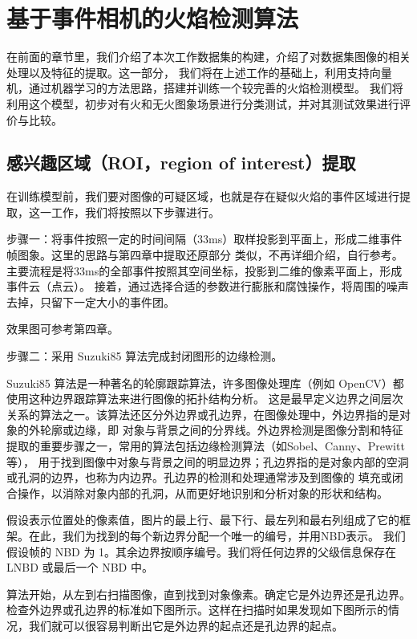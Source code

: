 
\chapter{基于事件相机的火焰检测算法}
在前面的章节里，我们介绍了本次工作数据集的构建，介绍了对数据集图像的相关处理以及特征的提取。这一部分，
我们将在上述工作的基础上，利用支持向量机，通过机器学习的方法思路，搭建并训练一个较完善的火焰检测模型。
我们将利用这个模型，初步对有火和无火图象场景进行分类测试，并对其测试效果进行评价与比较。

\section{感兴趣区域（ROI，region of interest）提取}
在训练模型前，我们要对图像的可疑区域，也就是存在疑似火焰的事件区域进行提取，这一工作，我们将按照以下步骤进行。

步骤一：将事件按照一定的时间间隔（33ms）取样投影到平面上，形成二维事件帧图象。这里的思路与第四章中提取还原部分
类似，不再详细介绍，自行参考。主要流程是将33ms的全部事件按照其空间坐标，投影到二维的像素平面上，形成事件云（点云）。
接着，通过选择合适的参数进行膨胀和腐蚀操作，将周围的噪声去掉，只留下一定大小的事件团。

效果图可参考第四章。

步骤二：采用 Suzuki85 算法完成封闭图形的边缘检测。

Suzuki85 算法是一种著名的轮廓跟踪算法\cite{suzuki1985topological}，许多图像处理库（例如 OpenCV）都使用这种边界跟踪算法来进行图像的拓扑结构分析。
这是最早定义边界之间层次关系的算法之一。该算法还区分外边界或孔边界，在图像处理中，外边界指的是对象的外轮廓或边缘，即
对象与背景之间的分界线。外边界检测是图像分割和特征提取的重要步骤之一，常用的算法包括边缘检测算法（如Sobel、Canny、Prewitt等），
用于找到图像中对象与背景之间的明显边界；孔边界指的是对象内部的空洞或孔洞的边界，也称为内边界。孔边界的检测和处理通常涉及到图像的
填充或闭合操作，以消除对象内部的孔洞，从而更好地识别和分析对象的形状和结构。

假设表示位置处的像素值，图片的最上行、最下行、最左列和最右列组成了它的框架。在此，我们为找到的每个新边界分配一个唯一的编号，并用NBD表示。
我们假设帧的 NBD 为 1。其余边界按顺序编号。我们将任何边界的父级信息保存在 LNBD 或最后一个 NBD 中。

算法开始，从左到右扫描图像，直到找到对象像素。确定它是外边界还是孔边界。检查外边界或孔边界的标准如下图所示。这样在扫描时如果发现如下图所示的情况，我们就可以很容易判断出它是外边界的起点还是孔边界的起点。

